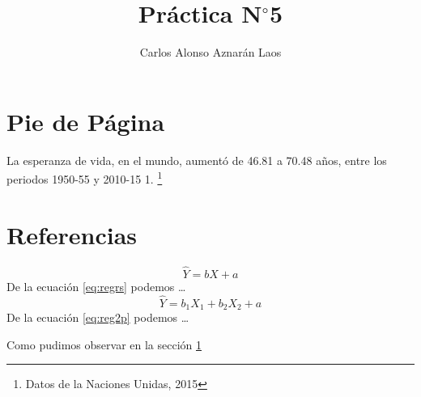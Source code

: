 \documentclass[12pt,a4paper]{article}
\author{Carlos Alonso Aznarán Laos}
\title{Práctica N$^{\circ}$5}
\begin{document}
\maketitle
\section{Pie de Página} \label{sec:pie}
La esperanza de vida, en el mundo, aumentó de 46.81 a 70.48 años, entre los periodos 1950-55 y 2010-15 1.
\footnote{Datos de la Naciones Unidas, 2015 }
\section{Referencias}
\begin{equation}
\hat{Y}=bX+a \label{eq:regrs}
\end{equation}
De la ecuación \ref{eq:regrs} podemos
\ldots
\begin{equation}
\boxed{ \hat{Y}=b_{1} X_{1} + b_{2} X_{2} +a} \label{eq:reg2p}
\end{equation}
De la ecuación \eqref{eq:reg2p} podemos \ldots

Como pudimos observar en la sección \ref{sec:pie}
\end{document}
